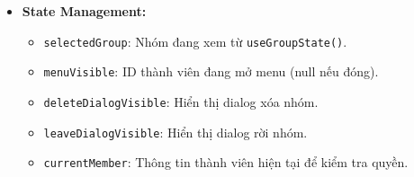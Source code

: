 \begin{itemize}
\begin{itemize}
\begin{itemize}
                    \item \texttt{crown} - Chủ nhóm
                    \item \texttt{shield-account} - Quản trị viên
                    \item \texttt{account} - Thành viên
                \end{itemize}
            \item \textbf{Nút hành động:}
                \begin{itemize}
                    \item ``Xóa nhóm'': Nền đỏ (\texttt{colors.error}), text trắng.
                    \item ``Rời khỏi nhóm'': Nền trắng, viền đỏ, text đỏ.
                \end{itemize}
        \end{itemize}
    \item \textbf{State Management:}
        \begin{itemize}
            \item \texttt{selectedGroup}: Nhóm đang xem từ \texttt{useGroupState()}.
            \item \texttt{menuVisible}: ID thành viên đang mở menu (null nếu đóng).
            \item \texttt{deleteDialogVisible}: Hiển thị dialog xóa nhóm.
            \item \texttt{leaveDialogVisible}: Hiển thị dialog rời nhóm.
            \item \texttt{currentMember}: Thông tin thành viên hiện tại để kiểm tra quyền.
        \end{itemize}
\end{itemize}

